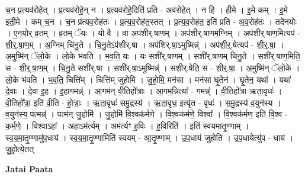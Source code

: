 \documentclass[17pt]{extarticle}
\begin{document}
च॒न प्र॒त्यव॑रोहेत् । प्र॒त्यव॑रोहे॒न् न । प्र॒त्यव॑रोहे॒दिति॑ प्रति - अव॑रोहेत् । न हि । हीमे । इ॒मे कम् । इ॒मे इती॒मे । कम् च॒न । च॒न प्र॑त्यव॒रोह॑तः । प्र॒त्य॒व॒रोह॑त॒स्तत् । प्र॒त्य॒व॒रोह॑त॒ इति॑ प्रति - अ॒व॒रोह॑तः । तदे॑नयोः । ए॒न॒यो॒र् व्र॒तम् । व्र॒तम् ॅयः । यो वै । वा अप॑शीर्.षाणम् । अप॑शीर्.षाणम॒ग्निम् । अप॑शीर्.षाण॒मित्यप॑ - शी॒र्॒.षा॒ण॒म् । अ॒ग्निम् चि॑नु॒ते । चि॒नु॒तेऽप॑शीर्.षा । अप॑शिर्.षा॒ऽमुष्मिन्न्॑ । अप॑शी॒र्॒.षेत्यप॑ - शी॒र्॒.षा॒ । अ॒मुष्मि॑न् ॅलो॒के । लो॒के भ॑वति । भ॒व॒ति॒ यः । यः सशी॑र्.षाणम् । सशी॑र्.षाणम् चिनु॒ते । सशी॑र्.षाण॒मिति॒ स - शी॒र्॒.षा॒ण॒म् । चि॒नु॒ते सशी॑र्.षा । सशी॑र्.षा॒ऽमुष्मिन्न्॑ । सशी॒र्.षेति॒ स - शी॒र्॒.षा॒ । अ॒मुष्मि॑न् ॅलो॒के । लो॒के भ॑वति । भ॒व॒ति॒ चित्ति᳚म् । चित्ति॑म् जुहोमि । जु॒हो॒मि॒ मन॑सा । मन॑सा घृ॒तेन॑ । घृ॒तेन॒ यथा᳚ । यथा॑ दे॒वाः । दे॒वा इ॒ह । इ॒हागमन्न्॑ । आ॒गम॑न् वी॒तिहो᳚त्राः । आ॒गम॒न्नित्या᳚ - गमन्न्॑ । वी॒तिहो᳚त्रा ऋता॒वृधः॑ । वी॒तिहो᳚त्रा॒ इति॑ वी॒ति - हो॒त्राः॒ । ऋ॒ता॒वृधः॑ समु॒द्रस्य॑ । ऋ॒ता॒वृध॒ इत्यृ॑त - वृधः॑ । स॒मु॒द्रस्य॑ व॒युन॑स्य । व॒युन॑स्य॒ पत्मन्न्॑ । पत्म॑न् जु॒होमि॑ । जु॒होमि॑ वि॒श्वक॑र्मणे । वि॒श्वक॑र्मणे॒ विश्वा᳚ । वि॒श्वक॑र्मण॒ इति॑ वि॒श्व - क॒र्म॒णे॒ । विश्वाऽहा᳚ । अहाऽम॑र्त्यम् । अम॑र्त्यꣳ ह॒विः । ह॒विरिति॑ । इति॑ स्वयमातृ॒ण्णाम् । स्व॒य॒मा॒तृ॒ण्णामु॑प॒धाय॑ । स्व॒य॒मा॒तृ॒ण्णामिति॑ स्वयम् - आ॒तृ॒ण्णाम् । उ॒प॒धाय॑ जुहोति । उ॒प॒धायेत्यु॑प - धाय॑ । जु॒हो॒त्ये॒तत् \newline

\textbf{Jatai Paata} \newline
\end{document}
